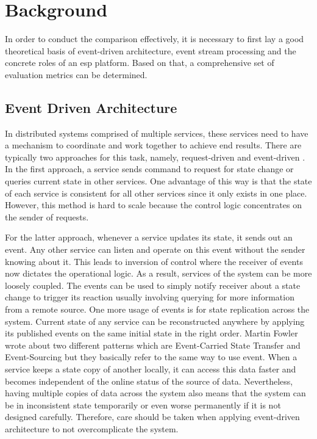 \chapter{Background} \label{chap:background}
In order to conduct the comparison effectively, it is necessary to first lay a good theoretical basis of event-driven architecture, event stream processing and the concrete roles of an \acrlong{esp} platform. Based on that, a comprehensive set of evaluation metrics can be determined.
\section{Event Driven Architecture}
In distributed systems comprised of multiple services, these services need to have a mechanism to coordinate and work together to achieve end results. There are typically two approaches for this task, namely, request-driven and event-driven \cite{stopford2018designingeventdriven}. In the first approach, a service sends command to request for state change or queries current state in other services. One advantage of this way is that the state of each service is consistent for all other services since it only exists in one place. However, this method is hard to scale because the control logic concentrates on the sender of requests.

For the latter approach, whenever a service updates its state, it sends out an event. Any other service can listen and operate on this event without the sender knowing about it. This leads to inversion of control where the receiver of events now dictates the operational logic. As a result, services of the system can be more loosely coupled. The events can be used to simply notify receiver about a state change to trigger its reaction usually involving querying for more information from a remote source. One more usage of events is for state replication across the system. Current state of any service can be reconstructed anywhere by applying its published events on the same initial state in the right order. Martin Fowler wrote about two different patterns which are Event-Carried State Transfer and Event-Sourcing \cite{martinfowlereventdriven} but they basically refer to the same way to use event. When a service keeps a state copy of another locally, it can access this data faster and becomes independent of the online status of the source of data. Nevertheless, having multiple copies of data across the system also means that the system can be in inconsistent state temporarily or even worse permanently if it is not designed carefully. Therefore, care should be taken when applying event-driven architecture to not overcomplicate the system.

